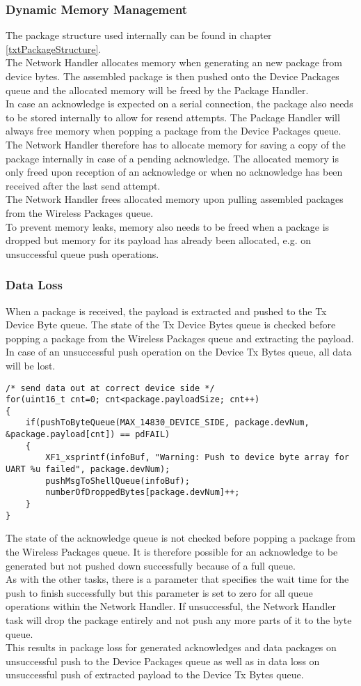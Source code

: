 \subsubsection{Dynamic Memory Management}
The package structure used internally can be found in chapter \ref{txtPackageStructure}.\\
The Network Handler allocates memory when generating an new package from device bytes. The assembled package is then pushed onto the Device Packages queue and the allocated memory will be freed by the Package Handler.\\
In case an acknowledge is expected on a serial connection, the package also needs to be stored internally to allow for resend attempts. The Package Handler will always free memory when popping a package from the Device Packages queue. The Network Handler therefore has to allocate memory for saving a copy of the package internally in case of a pending acknowledge. The allocated memory is only freed upon reception of an acknowledge or when no acknowledge has been received after the last send attempt.\\
The Network Handler frees allocated memory upon pulling assembled packages from the Wireless Packages queue.\\
To prevent memory leaks, memory also needs to be freed when a package is dropped but memory for its payload has already been allocated, e.g. on unsuccessful queue push operations.
\subsubsection{Data Loss}
When a package is received, the payload is extracted and pushed to the Tx Device Byte queue. The state of the Tx Device Bytes queue is checked before popping a package from the Wireless Packages queue and extracting the payload. In case of an unsuccessful push operation on the Device Tx Bytes queue, all data will be lost.
\begin{lstlisting}
/* send data out at correct device side */
for(uint16_t cnt=0; cnt<package.payloadSize; cnt++)
{
    if(pushToByteQueue(MAX_14830_DEVICE_SIDE, package.devNum, &package.payload[cnt]) == pdFAIL)
    {
        XF1_xsprintf(infoBuf, "Warning: Push to device byte array for UART %u failed", package.devNum);
        pushMsgToShellQueue(infoBuf);
        numberOfDroppedBytes[package.devNum]++;
    }
}
\end{lstlisting}
The state of the acknowledge queue is not checked before popping a package from the Wireless Packages queue. It is therefore possible for an acknowledge to be generated but not pushed down successfully because of a full queue.\\
As with the other tasks, there is a parameter that specifies the wait time for the push to finish successfully but this parameter is set to zero for all queue operations within the Network Handler. If unsuccessful, the Network Handler task will drop the package entirely and not push any more parts of it to the byte queue.\\
This results in package loss for generated acknowledges and data packages on unsuccessful push to the Device Packages queue as well as in data loss on unsuccessful push of extracted payload to the Device Tx Bytes queue.\\
